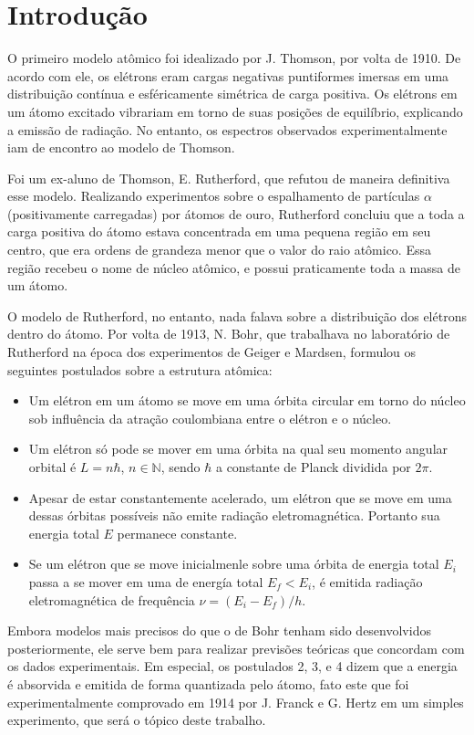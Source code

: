 \section{Introdução}

O primeiro modelo atômico foi idealizado por J. Thomson, por volta de 1910. 
De acordo com ele, os elétrons eram cargas negativas puntiformes imersas em uma distribuição contínua 
e esféricamente simétrica de carga positiva. 
Os elétrons em um átomo excitado vibrariam em torno de suas posições de equilíbrio, explicando 
a emissão de radiação. No entanto, os espectros observados experimentalmente iam de encontro ao modelo de Thomson.

Foi um ex-aluno de Thomson, E. Rutherford, que refutou de maneira definitiva esse modelo. 
Realizando experimentos sobre o espalhamento de partículas $\alpha$ (positivamente carregadas) por átomos de ouro, 
Rutherford concluiu que a toda a carga positiva do átomo estava concentrada em uma pequena região em seu centro, que era ordens de grandeza menor que o valor do raio atômico. 
Essa região recebeu o nome de núcleo atômico, e possui praticamente toda a massa de um átomo. 

O modelo de Rutherford, no entanto, nada falava sobre a distribuição dos elétrons dentro do átomo. 
Por volta de 1913, N. Bohr, que trabalhava no laboratório de Rutherford na época dos experimentos de Geiger e Mardsen, formulou os seguintes postulados sobre a estrutura atômica:

\begin{itemize}
\item[1.] Um elétron em um átomo se move em uma órbita circular em torno do núcleo sob influência 
da atração coulombiana entre o elétron e o núcleo.

\item[2.] Um elétron só pode se mover em uma órbita na qual seu momento angular orbital é 
$L = n\hbar$, $n \in \mathbb N$, sendo $\hbar$ a constante de Planck dividida por $2\pi$.

\item[3.] Apesar de estar constantemente acelerado, um elétron que se move em uma dessas órbitas
possíveis não emite radiação eletromagnética. Portanto sua energia total $E$ permanece constante.

\item[4.] Se um elétron que se move inicialmenle sobre uma órbita de energia total $E_i$ 
passa a se mover em uma de energía total $E_f < E_i$, é emitida radiação eletromagnética
de frequência $\nu = (E_i - E_f)/h$.
\end{itemize}

Embora modelos mais precisos do que o de Bohr tenham sido desenvolvidos posteriormente, ele serve bem para
realizar previsões teóricas que concordam com os dados experimentais. 
Em especial, os postulados 2, 3, e 4 dizem que a energia é absorvida e emitida de forma quantizada pelo átomo,
fato este que foi experimentalmente comprovado em 1914 por J. Franck e G. Hertz em um simples experimento, que será o 
tópico deste trabalho. \cite{eisberg} \cite{tipler}